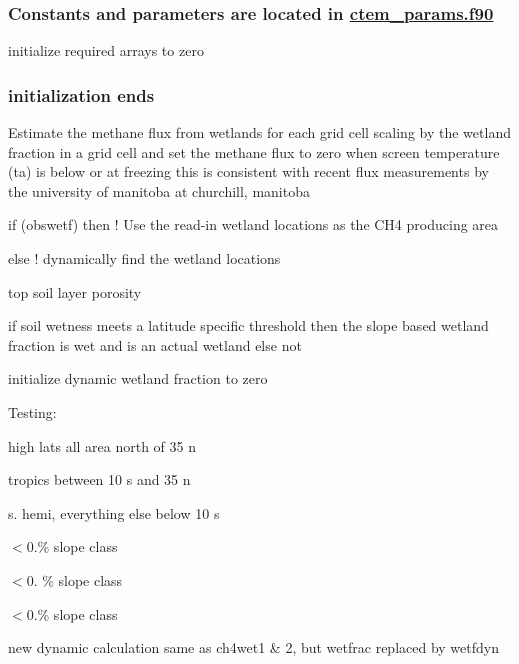  \subsubsection*{Constants and parameters are located in \hyperlink{ctem__params_8f90}{ctem\+\_\+params.\+f90} }

initialize required arrays to zero

\subsubsection*{initialization ends }

Estimate the methane flux from wetlands for each grid cell scaling by the wetland fraction in a grid cell and set the methane flux to zero when screen temperature (ta) is below or at freezing this is consistent with recent flux measurements by the university of manitoba at churchill, manitoba

if (obswetf) then ! Use the read-\/in wetland locations as the C\+H4 producing area

else ! dynamically find the wetland locations

top soil layer porosity

if soil wetness meets a latitude specific threshold then the slope based wetland fraction is wet and is an actual wetland else not

initialize dynamic wetland fraction to zero

Testing\+:

high lats all area north of 35 n

tropics between 10 s and 35 n

s. hemi, everything else below 10 s

$<$0.\% slope class

$<$0. \% slope class

$<$0.\% slope class

new dynamic calculation same as ch4wet1 \& 2, but wetfrac replaced by wetfdyn 